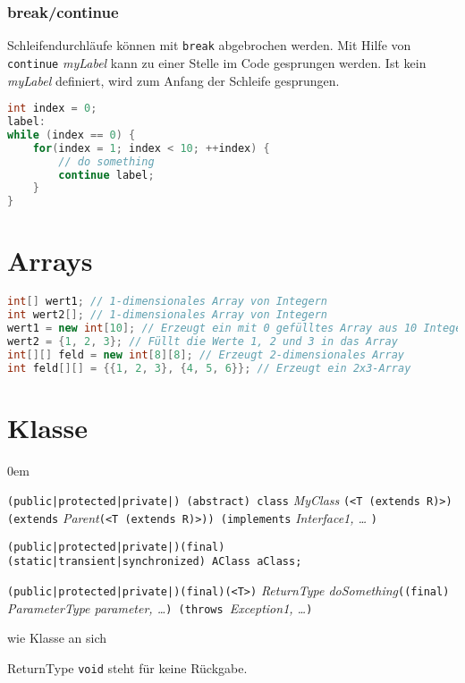 \subsubsection{break/continue}
Schleifendurchläufe können mit \texttt{break} abgebrochen werden.
Mit Hilfe von \texttt{continue} \textit{myLabel} kann zu einer Stelle im Code gesprungen werden.
Ist kein \textit{myLabel} definiert, wird zum Anfang der Schleife gesprungen.
\begin{lstlisting}[language=Java]
int index = 0;
label:
while (index == 0) {
	for(index = 1; index < 10; ++index) {
		// do something
		continue label;
	}
}
\end{lstlisting}

\section{Arrays}
\begin{lstlisting}[language=Java]
int[] wert1; // 1-dimensionales Array von Integern
int wert2[]; // 1-dimensionales Array von Integern
wert1 = new int[10]; // Erzeugt ein mit 0 gefülltes Array aus 10 Integern
wert2 = {1, 2, 3}; // Füllt die Werte 1, 2 und 3 in das Array
int[][] feld = new int[8][8]; // Erzeugt 2-dimensionales Array
int feld[][] = {{1, 2, 3}, {4, 5, 6}}; // Erzeugt ein 2x3-Array 
\end{lstlisting}

\section{Klasse}
\begin{description}\itemsep0em
	\item[Klassendeclaration] \texttt{(public|protected|private|) (abstract) class} \textit{MyClass} \texttt{(<T (extends R)>) (extends} \textit{Parent}\texttt{(<T (extends R)>)) (implements} \textit{Interface1, \dots} \texttt{)}
	\item[Datenfelder, Attribute] \texttt{(public|protected|private|)(final)}\\\texttt{(static|transient|synchronized) AClass }\texttt{aClass}\texttt{;}
	\item[Methoden] \texttt{(public|protected|private|)(final)(<T>)} \textit{ReturnType doSomething}\texttt{((final)}\textit{ ParameterType parameter, \dots}\texttt{)}\texttt{ (throws }\textit{Exception1, \dots}\texttt{)}
	\item[Innere Klassen] wie Klasse an sich
\end{description}
ReturnType \texttt{void} steht für keine Rückgabe.

